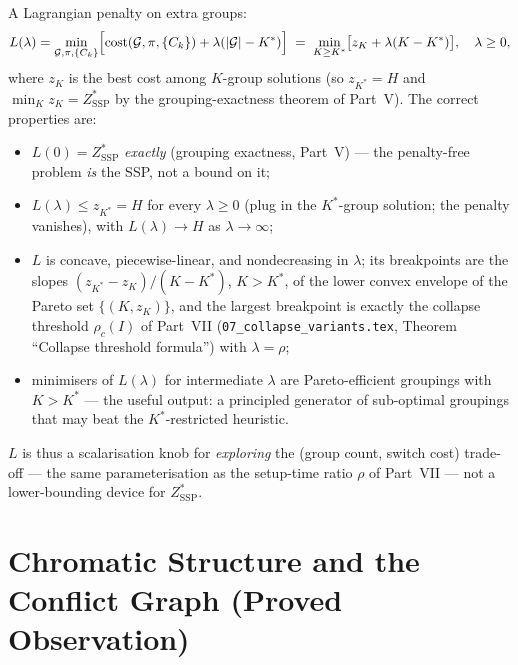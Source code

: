 \documentclass[11pt,a4paper]{article}
\theoremstyle{plain}
\theoremstyle{definition}
\newcommand{\Kstar}{K^*}
\newcommand{\calG}{\mathcal{G}}
\newcommand{\ZSSP}{Z_{\mathrm{SSP}}^*}
\begin{document}
A Lagrangian penalty on extra groups:
\[
  L(\lambda) = \min_{\calG,\pi,\{C_k\}} \Bigl[
  \mathrm{cost}(\calG,\pi,\{C_k\}) + \lambda(|\calG| - \Kstar)
  \Bigr]
  \;=\;\min_{K\ge\Kstar}\bigl[z_K+\lambda(K-\Kstar)\bigr], \quad \lambda \ge 0,
\]
where $z_K$ is the best cost among $K$-group solutions (so $z_{\Kstar}=H$ and
$\min_K z_K=\ZSSP$ by the grouping-exactness theorem of Part~V).
The correct properties are:
\begin{itemize}
\item $L(0)=\ZSSP$ \emph{exactly} (grouping exactness, Part~V) --- the penalty-free
  problem \emph{is} the SSP, not a bound on it;
\item $L(\lambda)\le z_{\Kstar}=H$ for every $\lambda\ge0$ (plug in the
  $\Kstar$-group solution; the penalty vanishes), with $L(\lambda)\to H$ as
  $\lambda\to\infty$;
\item $L$ is concave, piecewise-linear, and nondecreasing in $\lambda$; its
  breakpoints are the slopes $(z_{\Kstar}-z_K)/(K-\Kstar)$, $K>\Kstar$, of the
  lower convex
  envelope of the Pareto set $\{(K,z_K)\}$, and the largest breakpoint is exactly
  the collapse threshold $\rho_c(I)$ of Part~VII
  (\texttt{07\_collapse\_variants.tex}, Theorem ``Collapse threshold formula'')
  with $\lambda=\rho$;
\item minimisers of $L(\lambda)$ for intermediate $\lambda$ are Pareto-efficient
  groupings with $K>\Kstar$ --- the useful output: a principled generator of
  sub-optimal groupings that may beat the $\Kstar$-restricted heuristic.
\end{itemize}
$L$ is thus a scalarisation knob for \emph{exploring} the (group count, switch
cost) trade-off --- the same parameterisation as the setup-time ratio $\rho$ of
Part~VII --- not a lower-bounding device for $\ZSSP$.

\section{Chromatic Structure and the Conflict Graph (Proved Observation)}
\label{sec:chromatic}
\end{document}
